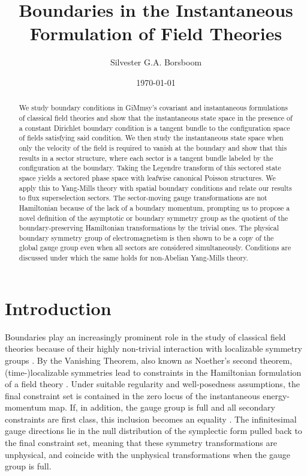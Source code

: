 \documentclass{article}
\title{Boundaries in the Instantaneous Formulation of Field Theories}
\author[1,*]{Silvester G.A. Borsboom}
\affil[1]{\normalsize Institute for Mathematics, Astrophysics and Particle Physics and Radboud Center for Natural Philosophy, Radboud University Nijmegen}
\affil[*]{silvester.borsboom@ru.nl}
\date{\today}
\theoremstyle{definition}
\begin{document}
\maketitle

\begin{abstract}

We study boundary conditions in GiMmsy's covariant and instantaneous formulations of classical field theories and show that the instantaneous state space in the presence of a constant Dirichlet boundary condition is a tangent bundle to the configuration space of fields satisfying said condition. We then study the instantaneous state space when only the velocity of the field is required to vanish at the boundary and show that this results in a sector structure, where each sector is a tangent bundle labeled by the configuration at the boundary. Taking the Legendre transform of this sectored state space yields a sectored phase space with leafwise canonical Poisson structures. We apply this to Yang-Mills theory with spatial boundary conditions and relate our results to flux superselection sectors. The sector-moving gauge transformations are not Hamiltonian because of the lack of a boundary momentum, prompting us to propose a novel definition of the asymptotic or boundary symmetry group as the quotient of the boundary-preserving Hamiltonian transformations by the trivial ones. The physical boundary symmetry group of electromagnetism is then shown to be a copy of the global gauge group even when all sectors are considered simultaneously. Conditions are discussed under which the same holds for non-Abelian Yang-Mills theory.

\end{abstract}

\section{Introduction}\label{intro}

Boundaries play an increasingly prominent role in the study of classical field theories because of their highly non-trivial interaction with localizable symmetry groups \cite{Regge:1974zd}. By the Vanishing Theorem, also known as Noether's second theorem, (time-)localizable symmetries lead to constraints in the Hamiltonian formulation of a field theory \cite{binz,Gotay2006MomentumMA}. Under suitable regularity and well-posedness assumptions, the final constraint set is contained in the zero locus of the instantaneous energy-momentum map. If, in addition, the gauge group is full and all secondary constraints are first class, this inclusion becomes an equality \cite[Theorem 10B.1]{Gotay2006MomentumMA}. The infinitesimal gauge directions lie in the null distribution of the symplectic form pulled back to the final constraint set, meaning that these symmetry transformations are unphysical, and coincide with the unphysical transformations when the gauge group is full.
\end{document}
